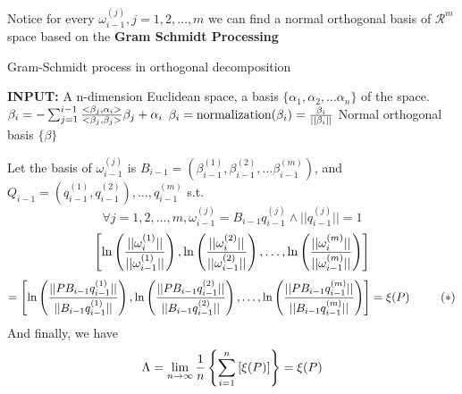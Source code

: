\documentclass[12pt]{article}
\theoremstyle{plain}
\begin{document}
Notice for every $\omega^{(j)}_{i-1}, j = 1, 2, \ldots, m$ we can find a normal orthogonal basis of $\mathcal R^m$ space based on the \textbf{Gram Schmidt Processing}

\begin{algorithm}[H]
\caption{Gram-Schmidt process in orthogonal decomposition}\label{gram-schmidt}
\begin{algorithmic}
\State \textbf{INPUT:} A n-dimension Euclidean space, a basis $\{\alpha_1, \alpha_2, \ldots \alpha_n\}$ of the space.
\State {}
    \State $\beta_{i} = -\sum_{j = 1}^{i-1}{<\beta_j, \alpha_{i}> \over <\beta_j, \beta_j>}\beta_j + \alpha_i$
    \State $\beta_i = \text{normalization}(\beta_i) = {\beta_i \over ||\beta_i||}$
\EndFor
\State \Return Normal orthogonal basis $\{\beta\}$
\EndProcedure
\end{algorithmic}
\end{algorithm}

Let the basis of $\omega^{(j)}_{i-1}$ is $B_{i-1} = (\beta^{(1)}_{i-1}, \beta^{(2)}_{i-1}, \ldots \beta^{(m)}_{i-1})$, and $Q_{i-1} = (q^{(1)}_{i-1}, q^{(2)}_{i-1}), \ldots , q^{(m)}_{i-1}$ s.t.
$$
\forall j = 1, 2, \ldots, m, \omega^{(j)}_{i-1} = B_{i-1}q^{(j)}_{i-1} \land ||q^{(j)}_{i-1}|| = 1
$$
$$
\left[
\ln\left({||\omega^{(1)}_i|| \over ||\omega^{(1)}_{i-1}||}\right),
\ln\left({||\omega^{(2)}_i|| \over ||\omega^{(2)}_{i-1}||}\right),
\ldots,
\ln\left({||\omega^{(m)}_i|| \over ||\omega^{(m)}_{i-1}||}\right)
\right] 
$$
$$
= 
\left[
\ln\left({||PB_{i-1}q^{(1)}_{i-1}|| \over ||B_{i-1}q^{(1)}_{i-1}||}\right),
\ln\left({||PB_{i-1}q^{(2)}_{i-1}|| \over ||B_{i-1}q^{(2)}_{i-1}||}\right),
\ldots,
\ln\left({||PB_{i-1}q^{(m)}_{i-1}|| \over ||B_{i-1}q^{(m)}_{i-1}||}\right)
\right] 
= 
\xi(P) \ \ \ \ \ \ \ \ (*)
$$
And finally, we have
$$
\Lambda
= \lim_{n \rightarrow \infty}{1\over n}\left\{
\sum_{i = 1}^{n}
\left[
\xi(P)
\right]\right\} = \xi(P)
$$
\end{document}
